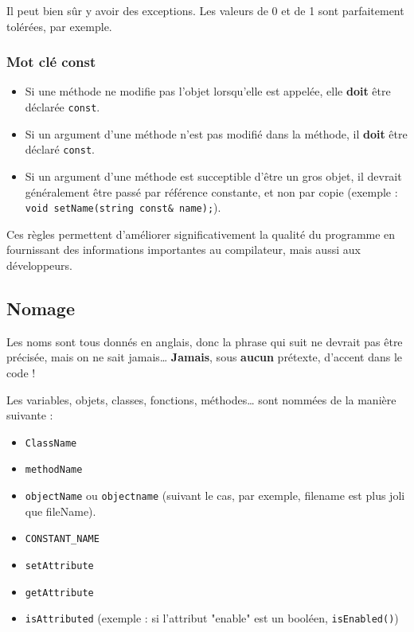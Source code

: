 \begin{note}
Il peut bien sûr y avoir des exceptions. Les valeurs de 0 et de 1 sont parfaitement tolérées, par exemple.
\end{note}

\subsubsection{Mot clé const}

\begin{itemize}
  \item Si une méthode ne modifie pas l'objet lorsqu'elle est appelée, elle \textbf{doit} être déclarée \verb+const+.
  \item Si un argument d'une méthode n'est pas modifié dans la méthode, il \textbf{doit} être déclaré \verb+const+.
  \item Si un argument d'une méthode est succeptible d'être un gros objet, il devrait généralement être passé par référence constante, et non par copie (exemple : \verb+void setName(string const& name);+).
\end{itemize}

Ces règles permettent d'améliorer significativement la qualité du programme en fournissant des informations importantes au compilateur, mais aussi aux développeurs.

\subsection{Nomage}

Les noms sont tous donnés en anglais, donc la phrase qui suit ne devrait pas être précisée, mais on ne sait jamais… 
\textbf{Jamais}, sous \textbf{aucun} prétexte, d'accent dans le code !

Les variables, objets, classes, fonctions, méthodes… sont nommées de la manière suivante :

\begin{itemize}
  \item \verb+ClassName+
  \item \verb+methodName+
  \item \verb+objectName+ ou \verb+objectname+ (suivant le cas, par exemple, filename est plus joli que fileName).
  \item \verb+CONSTANT_NAME+
  \item \verb+setAttribute+
  \item \verb+getAttribute+
  \item \verb+isAttributed+ (exemple : si l'attribut "enable" est un booléen, \verb+isEnabled()+)
\end{itemize}

